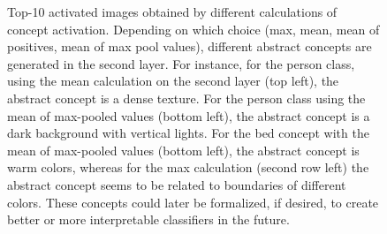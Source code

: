 \documentclass{article}
\begin{document}
\begin{figure}[t]
  \caption{Top-10 activated images obtained by different calculations of concept activation. Depending on which choice (max, mean, mean of positives, mean of max pool values), different abstract concepts are generated in the second layer. For instance, for the person class, using the mean calculation on the second layer (top left), the abstract concept is a dense texture. For the person class using the mean of max-pooled values (bottom left), the abstract concept is a dark background with vertical lights. For the bed concept with the mean of max-pooled values (bottom left), the abstract concept is warm colors, whereas for the max calculation (second row left) the abstract concept seems to be related to boundaries of different colors. These concepts could later be formalized, if desired, to create better or more interpretable classifiers in the future.}
  \label{fig:top10_act}
\end{figure}
\end{document}
